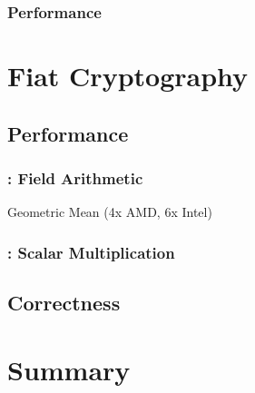 \documentclass[dvipsnames,table,aspectratio=169]{beamer}
\newcommand{\fiat}{\textsf{Fiat Cryptography}\xspace}
\begin{document}
\begin{frame}[c]{}
    \frametitle{Performance}
    \centering
        
\end{frame}

\section{\fiat}
\subsection{Performance}
\begin{frame}[c]{}
    \frametitle{\insertsection}
    \centering
    \vspace{-1em}
    

\end{frame}

\begin{frame}[c]{}
    \centering
    \frametitle{\insertsubsection: Field Arithmetic}

    Geometric Mean (4x AMD, 6x Intel)\\
    

\end{frame}

\newcommand{\hil}{\cellcolor{lightgray}}
\begin{frame}[c]{}
    \centering
    \frametitle{\insertsubsection: Scalar Multiplication}
    \vspace{-1em}
     {}
     {}
     {}

\end{frame}

\subsection{Correctness}
\begin{frame}[c]{}
    \centering
    \frametitle{\insertsubsection}

    

\end{frame}



\section{Summary}
\end{document}
